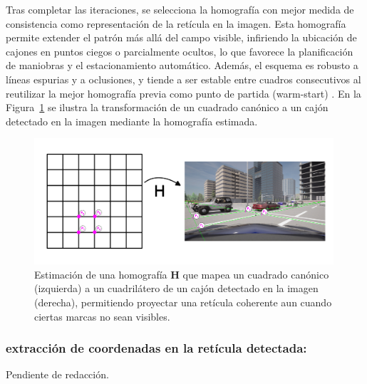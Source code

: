 \noindent
Tras completar las iteraciones, se selecciona la homografía con mejor medida de consistencia 
como representación de la retícula en la imagen. 
Esta homografía permite extender el patrón más allá del campo visible, 
infiriendo la ubicación de cajones en puntos ciegos o parcialmente ocultos, 
lo que favorece la planificación de maniobras y el estacionamiento automático. 
Además, el esquema es robusto a líneas espurias y a oclusiones, 
y tiende a ser estable entre cuadros consecutivos al reutilizar la mejor homografía previa como
punto de partida (warm-start) . En la Figura~\ref{fig:ramsac-transform} se ilustra 
la transformación de un cuadrado canónico a un cajón detectado en la imagen mediante la homografía estimada.


\begin{figure}[!ht]
    \centering
    \includegraphics[width=0.99\textwidth]{img/3-metodo/transformacion.png}
    \caption{Estimación de una homografía \(\mathbf{H}\) que mapea un cuadrado canónico (izquierda) a un cuadrilátero de un cajón detectado en la imagen (derecha), permitiendo proyectar una retícula coherente aun cuando ciertas marcas no sean visibles.}
    \label{fig:ramsac-transform}
\end{figure}

\subsubsection{extracción de coordenadas en la retícula detectada:}
Pendiente de redacción.
